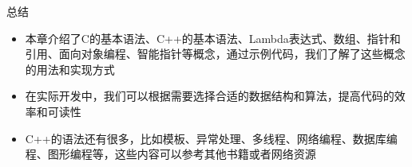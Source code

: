 \documentclass[UTF8,aspectratio=169]{beamer}
\begin{document}
\begin{frame}{总结}
    \begin{itemize}
        \item 本章介绍了C的基本语法、C++的基本语法、Lambda表达式、数组、指针和引用、面向对象编程、智能指针等概念，通过示例代码，我们了解了这些概念的用法和实现方式
        \item 在实际开发中，我们可以根据需要选择合适的数据结构和算法，提高代码的效率和可读性
        \item C++的语法还有很多，比如模板、异常处理、多线程、网络编程、数据库编程、图形编程等，这些内容可以参考其他书籍或者网络资源
    \end{itemize}
\end{frame}
\end{document}
